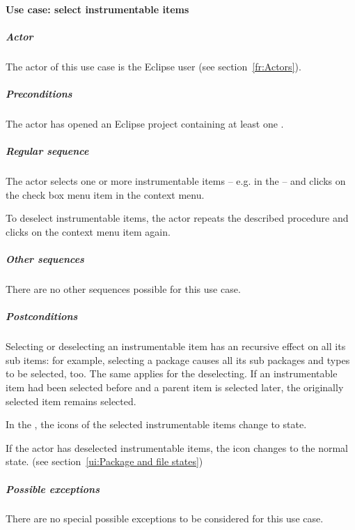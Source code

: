 \paragraph{Use case: select instrumentable items} \label{fr:Use case: select instrumentable items}
\subparagraph{Actor}
The actor of this use case is the Eclipse user (see section~\ref{fr:Actors}).
\subparagraph{Preconditions}
The actor has opened an Eclipse project containing at least one .
\subparagraph{Regular sequence}
The actor selects one or more instrumentable items -- e.g. in the  -- and clicks on the check box menu item  in the context menu.
\par
To deselect instrumentable items, the actor repeats the described procedure and clicks on the context menu item  again.
\subparagraph{Other sequences}
There are no other sequences possible for this use case.
\subparagraph{Postconditions}
Selecting or deselecting an instrumentable item has an recursive effect on all its sub items: for example, selecting a package causes all its sub packages and types to be selected, too. The same applies for the deselecting. If an instrumentable item had been selected before and a parent item is selected later, the originally selected item remains selected.
\par
In the , the icons of the selected instrumentable items change to  state.
\par
If the actor has deselected instrumentable items, the icon changes to the normal state. (see section~\ref{ui:Package and file states})
\subparagraph{Possible exceptions}
There are no special possible exceptions to be considered for this use case.

